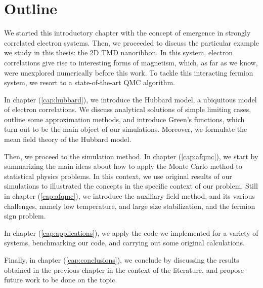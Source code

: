 \section{Outline}
\label{sec:int_outline}

We started this introductory chapter with the concept of emergence in strongly correlated electron systems.
Then, we proceeded to discuss the particular example we study in this thesis: the \acs{2D} \acs{TMD} nanoribbon.
In this system, electron correlations give rise to interesting forms of magnetism, which, as far as we know, were unexplored numerically before this work.
To tackle this interacting fermion system, we resort to a state-of-the-art \ac{QMC} algorithm.

In chapter (\ref{cap:hubbard}), we  introduce the Hubbard model, a ubiquitous model of electron correlations.
We discuss analytical solutions of simple limiting cases, outline some approximation methods, and introduce Green's functions, which turn out to be the main object of our simulations.
Moreover, we formulate the mean field theory of the Hubbard model.

Then, we proceed to the simulation method.
In chapter (\ref{cap:afqmc}), we start by summarizing the main ideas about how to apply the Monte Carlo method to statistical physics problems.
In this context, we use original results of our simulations to illustrated the concepts in the specific context of our problem.
Still in chapter (\ref{cap:afqmc}), we introduce the auxiliary field method, and its various challenges, namely low temperature, and large size stabilization, and the fermion sign problem.

In chapter (\ref{cap:applications}), we apply the code we implemented for a variety of systems, benchmarking our code, and carrying out some original calculations.

Finally, in chapter (\ref{cap:conclusions}), we conclude by discussing the results obtained in the previous chapter in the context of the literature, and propose future work to be done on the topic.
